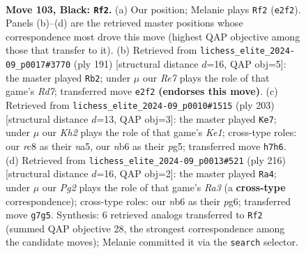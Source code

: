 \documentclass[11pt]{article}
\begin{document}
\clearpage

\begin{figure}[p]\centering
\begin{subfigure}{0.46\textwidth}\centering
\resizebox{\linewidth}{!}{%
\newchessgame
\chessboard[
  setfen={2R5/6pk/1N3p2/7p/7P/6PK/4r3/8 b - - 31 103},
  showmover=false,
  pgfstyle=straightmove, color=movearrow, markmove={e2-f2}
]}
\caption{}
\end{subfigure}\hfill
\begin{subfigure}{0.46\textwidth}\centering
\resizebox{\linewidth}{!}{%
\newchessgame
\chessboard[
  setfen={8/R7/6pk/7p/7P/6PK/3r4/8 b - - 29 96},
  showmover=false,
  pgfstyle=straightmove, color=movearrow, markmove={d2-b2}
]}
\caption{}
\end{subfigure}
\\[4pt]
\begin{subfigure}{0.46\textwidth}\centering
\resizebox{\linewidth}{!}{%
\newchessgame
\chessboard[
  setfen={4k3/5p2/6p1/N2P2P1/4KP2/b7/8/8 b - - 34 102},
  showmover=false,
  pgfstyle=straightmove, color=movearrow, markmove={e8-e7}
]}
\caption{}
\end{subfigure}\hfill
\begin{subfigure}{0.46\textwidth}\centering
\resizebox{\linewidth}{!}{%
\newchessgame
\chessboard[
  setfen={8/8/6pk/7p/7P/R2K1PP1/8/1r6 w - - 27 109},
  showmover=false,
  pgfstyle=straightmove, color=movearrow, markmove={a3-a4}
]}
\caption{}
\end{subfigure}
\caption{\textbf{Move 103, Black: \texttt{Rf2}.} (a) Our position; Melanie plays \texttt{Rf2} (\texttt{e2f2}). Panels (b)--(d) are the retrieved master positions whose correspondence most drove this move (highest QAP objective among those that transfer to it). (b) Retrieved from \texttt{lichess\_elite\_2024-09\_p0017\#3770} (ply 191) [structural distance $d$=16, QAP obj=5]: the master played \texttt{Rb2}; under $\mu$ our \emph{Re7} plays the role of that game's \emph{Rd7}; transferred move \texttt{e2f2} \textbf{(endorses this move)}. (c) Retrieved from \texttt{lichess\_elite\_2024-09\_p0010\#1515} (ply 203) [structural distance $d$=13, QAP obj=3]: the master played \texttt{Ke7}; under $\mu$ our \emph{Kh2} plays the role of that game's \emph{Ke1}; cross-type roles: our \emph{r}c8 as their \emph{n}a5, our \emph{n}b6 as their \emph{p}g5; transferred move \texttt{h7h6}. (d) Retrieved from \texttt{lichess\_elite\_2024-09\_p0013\#521} (ply 216) [structural distance $d$=16, QAP obj=2]: the master played \texttt{Ra4}; under $\mu$ our \emph{Pg2} plays the role of that game's \emph{Ra3} (a \textbf{cross-type} correspondence); cross-type roles: our \emph{n}b6 as their \emph{p}g6; transferred move \texttt{g7g5}. Synthesis: 6 retrieved analogs transferred to \texttt{Rf2} (summed QAP objective 28, the strongest correspondence among the candidate moves); Melanie committed it via the \texttt{search} selector.}
\label{fig:thought-m205}
\end{figure}
\end{document}
